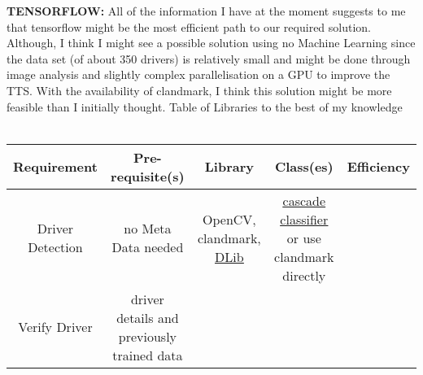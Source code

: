 \documentclass{article}
\begin{document}
\textbf{TENSORFLOW:}
    All of the information I have at the moment suggests to me that tensorflow might be the most efficient path to our required 
    solution. Although, I think I might see a possible solution using no Machine Learning since the data set (of about 350 drivers)
    is relatively small and might be done through image analysis and slightly complex parallelisation on a GPU to improve the TTS. 
    With the availability of clandmark, I think this solution might be more feasible than I initially thought.
\newpage
\Large{Table of Libraries to the best of my knowledge}
\\ \vspace{1cm} \\
\begin{tabulary}{\textwidth}{|C|C|C|C|C|}
    \hline
    Requirement & Pre-requisite(s) & Library & Class(es) & Efficiency \\
    \hline  
    Driver Detection & no Meta Data needed & OpenCV, clandmark, \href{http://www.learnopencv.com/facial-landmark-detection/}{\underline{DLib}} & \href{http://docs.opencv.org/2.4/doc/tutorials/objdetect/cascade_classifier/cascade_classifier.html}{\underline{cascade classifier}} or use clandmark directly & \\ \hline
    Verify Driver & driver details and previously trained data & & & \\

    \hline
  \end{tabulary}
\end{document}
